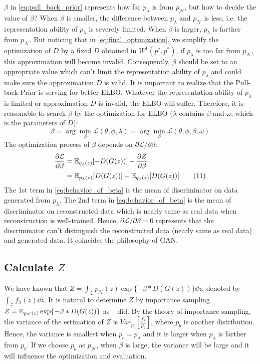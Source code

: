 $\beta$ in \cref{eq:pull_back_prior} represents how far $p_\lambda$ is from $p_\mathcal{N}$, but how to decide the value of $\beta$? When $\beta$ is smaller, the difference between $p_\lambda$ and $p_\mathcal{N}$ is less, i.e. the representation ability of $p_\lambda$ is severely limited. When $\beta$ is larger, $p_\lambda$ is farther from $p_\mathcal{N}$. But noticing that in \cref{eq:final_optimization}, we simplify the optimization of $D$ by a fixed $D$ obtained in $W^1(p^\dag, p^*)$, if $p_\lambda$ is too far from $p_\mathcal{N}$, this approximation will become invalid. Consequently, $\beta$ should be set to an appropriate value which can't limit the representation ability of $p_\lambda$ and could make sure the approximation $D$ is valid. It is important to realize that the Pull-back Prior is serving for better ELBO. Whatever the representation ability of $p_\lambda$ is limited or approximation $D$ is invalid, the ELBO will suffer. Therefore, it is reasonable to search $\beta$ by the optimization for ELBO ($\lambda$ contains $\beta$ and $\omega$, which is the parameters of $D$):
\begin{equation}
	\beta = \arg \min_{\beta} \mathcal{L}(\theta, \phi, \lambda) = \arg \min_{\beta} \mathcal{L}(\theta, \phi, \beta, \omega) \tag{10}
\end{equation}
The optimization process of $\beta$ depends on $\partial \mathcal{L}/\partial \beta$:
\begin{align*}\label{eq:behavior_of_beta}
\frac{\partial \mathcal{L}}{\partial \beta} &= \operatorname{\mathbb{E}}_{q_\phi(z)}[ -D(G(z))] - \frac{\partial Z}{\partial \beta} \\
&= \operatorname{\mathbb{E}}_{p_\lambda(z)}[ D(G(z))] - \operatorname{\mathbb{E}}_{q_\phi(z)}[ D(G(z))]  \tag{11}
\end{align*}
The 1st term in \cref{eq:behavior_of_beta} is the mean of discriminator on data generated from $p_\lambda$. The 2nd term in \cref{eq:behavior_of_beta} is the mean of discriminator on reconstructed data which is nearly same as real data when reconstruction is well-trained. Hence, $\partial \mathcal{L}/\partial \beta = 0$ represents that the discriminator can't distinguish the reconstructed data (nearly same as real data) and generated data. It coincides the philosophy of GAN.

\subsection{Calculate $Z$}\label{subsec:determine_z}

We have known that $Z = \int_{\mathcal{Z}} p_\mathcal{N}(z) \exp\{- \beta * D(G(z))\} \dd z$, denoted by $\int_{\mathcal{Z}} f_\lambda(z) \dd z$. It is natural to determine $Z$ by importance sampling $Z = \operatorname{\mathbb{E}}_{p_\mathcal{N}(z)} \exp\{- \beta * D(G(z))\}$ as ~\cite{bauer2019resampled} did. By the theory of importance sampling, the variance of the estimation of $Z$ is $Var_{p_b}[\frac{f_\lambda}{p_b}]$, where $p_b$ is another distribution. Hence, the variance is smallest when $p_b = p_\lambda$ and it is larger when $p_\lambda$ is farther from $p_b$. If we choose $p_b$ as $p_\mathcal{N}$, when $\beta$ is large, the variance will be large and it will influence the optimization and evaluation. 

